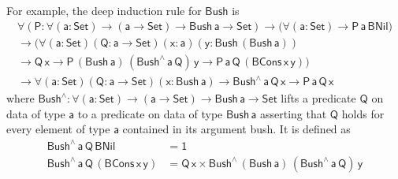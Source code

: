 \documentclass[acmsmall,screen,review,anonymous]{acmart}
\theoremstyle{definition}
\begin{document}
For example, the deep induction rule for $\mathsf{Bush}$ is
\begin{multline}
\mathsf{\forall (P : \forall (a : Set) \to (a \to Set) \to Bush\, a \to Set)
\to \big( \forall (a : Set) \to P\,a\,BNil \big)} \\
\mathsf{\to \big( \forall (a : Set) (Q : a \to Set) (x : a) (y : Bush\,(Bush\,a))} \\
\mathsf{\to Q\,x \to P\,(Bush\,a)\,(Bush^{\wedge}\,a\,Q)\,y \to P\,a\,Q\,(BCons\,x\,y) \big)} \\
\mathsf{\to \forall (a : Set) (Q : a \to Set) (x : Bush\,a) \to Bush^{\wedge}\,a\,Q\,x \to P\,a\,Q\,x }
\end{multline}
where $\mathsf{Bush^{\wedge} : \forall (a : Set) \to (a \to Set) \to Bush\,a \to Set}$ lifts a predicate $\mathsf{Q}$ on data of type $\mathsf{a}$ to a predicate on data of type $\mathsf{Bush\,a}$ asserting that $\mathsf{Q}$ holds for every element of type $\mathsf{a}$ contained in its argument bush.
It is defined as
\begin{align*}
\mathsf{Bush^{\wedge}\,a\,Q\,BNil} &= \mathsf{1} \\
\mathsf{Bush^{\wedge}\,a\,Q\,(BCons\,x\,y)} &= \mathsf{Q\,x \times Bush^{\wedge}\,(Bush\,a)\,(Bush^{\wedge}\,a\,Q)\,y}
\end{align*}
\end{document}
